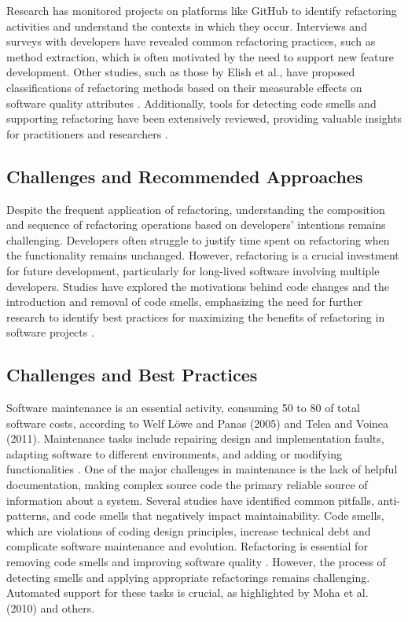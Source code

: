 Research has monitored projects on platforms like GitHub to identify refactoring activities and understand the contexts in which they occur. Interviews and surveys with developers have revealed common refactoring practices, such as method extraction, which is often motivated by the need to support new feature development. Other studies, such as those by Elish et al., have proposed classifications of refactoring methods based on their measurable effects on software quality attributes   . Additionally, tools for detecting code smells and supporting refactoring have been extensively reviewed, providing valuable insights for practitioners and researchers   .

\subsection{Challenges and Recommended Approaches}
Despite the frequent application of refactoring, understanding the composition and sequence of refactoring operations based on developers' intentions remains challenging. Developers often struggle to justify time spent on refactoring when the functionality remains unchanged. However, refactoring is a crucial investment for future development, particularly for long-lived software involving multiple developers. Studies have explored the motivations behind code changes and the introduction and removal of code smells, emphasizing the need for further research to identify best practices for maximizing the benefits of refactoring in software projects   .

\subsection{Challenges and Best Practices}
Software maintenance is an essential activity, consuming 50 to 80 of total software costs, according to Welf Löwe and Panas (2005) and Telea and Voinea (2011). Maintenance tasks include repairing design and implementation faults, adapting software to different environments, and adding or modifying functionalities   . One of the major challenges in maintenance is the lack of helpful documentation, making complex source code the primary reliable source of information about a system. Several studies have identified common pitfalls, anti-patterns, and code smells that negatively impact maintainability. Code smells, which are violations of coding design principles, increase technical debt and complicate software maintenance and evolution. Refactoring is essential for removing code smells and improving software quality   . However, the process of detecting smells and applying appropriate refactorings remains challenging. Automated support for these tasks is crucial, as highlighted by Moha et al. (2010) and others.




